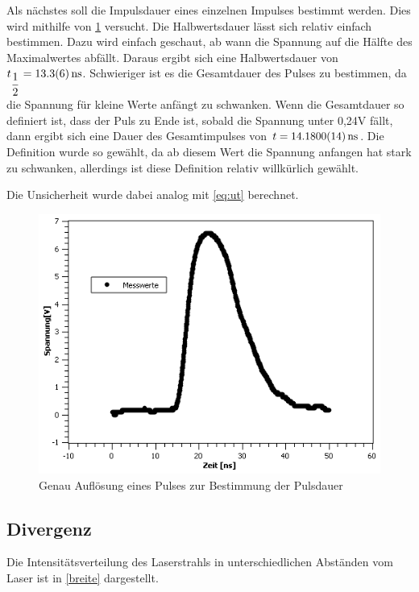 \documentclass[
	a4paper,
	12pt,
	pagesize,
	ngerman
]{scrartcl}
\begin{document}
Als nächstes soll die Impulsdauer eines einzelnen Impulses bestimmt werden. Dies wird mithilfe von \cref{Pulsdauer} versucht. Die Halbwertsdauer lässt sich relativ einfach bestimmen. Dazu wird einfach geschaut, ab wann die Spannung auf die Hälfte des Maximalwertes abfällt. Daraus ergibt sich eine Halbwertsdauer von $t_{\dfrac{1}{2}} = \SI{13,3 \pm 0,6}{ns}$. Schwieriger ist es die Gesamtdauer des Pulses zu bestimmen, da die Spannung für kleine Werte anfängt zu schwanken. Wenn die Gesamtdauer so definiert ist, dass der Puls zu Ende ist, sobald die Spannung unter 0,24V fällt, dann ergibt sich eine Dauer des Gesamtimpulses von $t = \SI{14,180 \pm 0,0014}{ns}$. Die Definition wurde so gewählt, da ab diesem Wert die Spannung anfangen hat stark zu schwanken, allerdings ist diese Definition relativ willkürlich gewählt. 

Die Unsicherheit wurde dabei analog mit \cref{eq:ut} berechnet.

\begin{figure}[h!]
	\centering
	\includegraphics[scale=0.7]{Pulsdauer.png}
	\caption{Genau Auflösung eines Pulses zur Bestimmung der Pulsdauer}
	\label{Pulsdauer}
\end{figure}

\subsection{Divergenz}
Die Intensitätsverteilung des Laserstrahls in unterschiedlichen Abständen vom Laser ist in \cref{breite} dargestellt.
\end{document}
